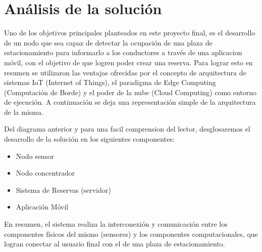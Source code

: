 \newpage
\section{Análisis de la solución}
Uno de los objetivos principales planteados en este proyecto final, es el desarrollo de un nodo que sea capaz de detectar la ocupación de una plaza de estacionamiento para informarlo a los conductores a través de una aplicacion móvil, con el objetivo de que logren poder crear una reserva. Para lograr esto en resumen se utilizaron las ventajas ofrecidas por el concepto de arquitectura de sistemas IoT (Internet of Things), el paradigma de Edge Computing (Computación de Borde) y el poder de la nube (Cloud Computing) como entorno de ejecución. A continuación se deja una representación simple de la arquitectura de la misma.


Del diagrama anterior y para una facil comprension del lector, desglosaremos el desarrollo de la solución en los siguientes componentes:

\begin{itemize}
    \item Nodo sensor
    \item Nodo concentrador
    \item Sistema de Reservas (servidor)
    \item Aplicación Móvil
\end{itemize}

En resumen, el sistema realiza la interconexión y comunicación entre los componentes físicos del mismo (sensores) y los componentes computacionales, que logran conectar al usuario final con el de una plaza de estacionamiento.








